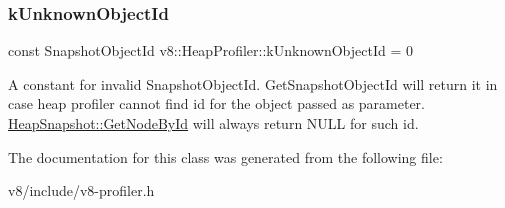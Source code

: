 \subsubsection{\texorpdfstring{k\+Unknown\+Object\+Id}{kUnknownObjectId}}
{\footnotesize\ttfamily const Snapshot\+Object\+Id v8\+::\+Heap\+Profiler\+::k\+Unknown\+Object\+Id = 0\hspace{0.3cm}{\ttfamily [static]}}

A constant for invalid Snapshot\+Object\+Id. Get\+Snapshot\+Object\+Id will return it in case heap profiler cannot find id for the object passed as parameter. \mbox{\hyperlink{classv8_1_1HeapSnapshot_a0aec9c1535c27bc8b1b55579969203fc}{Heap\+Snapshot\+::\+Get\+Node\+By\+Id}} will always return N\+U\+LL for such id. 

The documentation for this class was generated from the following file\+:\begin{DoxyCompactItemize}
\item 
v8/include/v8-\/profiler.\+h\end{DoxyCompactItemize}
